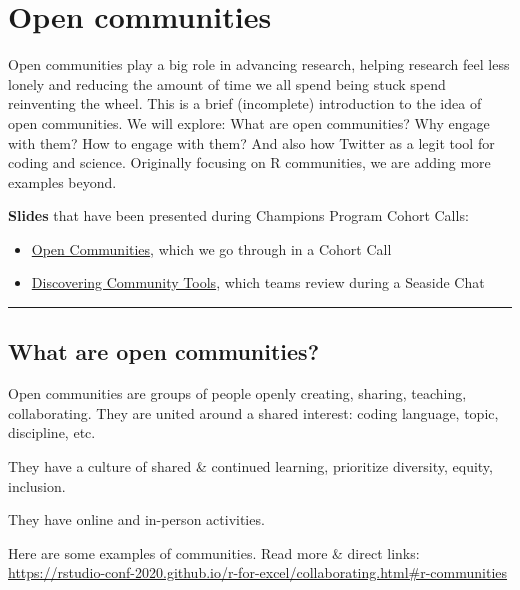 \documentclass[
  letterpaper,
  DIV=11,
  numbers=noendperiod]{scrreprt}
\providecommand{\tightlist}{%
  \setlength{\itemsep}{0pt}\setlength{\parskip}{0pt}}
\begin{document}
\hypertarget{communities}{%
\chapter{Open communities}\label{communities}}

Open communities play a big role in advancing research, helping research
feel less lonely and reducing the amount of time we all spend being
stuck spend reinventing the wheel. This is a brief (incomplete)
introduction to the idea of open communities. We will explore: What are
open communities? Why engage with them? How to engage with them? And
also how Twitter as a legit tool for coding and science. Originally
focusing on R communities, we are adding more examples beyond.

\textbf{Slides} that have been presented during Champions Program Cohort
Calls:

\begin{itemize}
\tightlist
\item
  \href{https://docs.google.com/presentation/d/17HSNmBYvPw-7Prioys7WIhL9QGVb3s3bJCLaAJVaChc/edit?usp=sharing}{Open
  Communities}, which we go through in a Cohort Call
\item
  \href{https://docs.google.com/presentation/d/1czvMz7a84jkaYDwHlG1cuKyf9B0mciQJVOFcc7hZtpU/edit?usp=sharing}{Discovering
  Community Tools}, which teams review during a Seaside Chat
\end{itemize}

\begin{center}\rule{0.5\linewidth}{0.5pt}\end{center}

\hypertarget{what-are-open-communities}{%
\section{What are open communities?}\label{what-are-open-communities}}

Open communities are groups of people openly creating, sharing,
teaching, collaborating. They are united around a shared interest:
coding language, topic, discipline, etc.

They have a culture of shared \& continued learning, prioritize
diversity, equity, inclusion.

They have online and in-person activities.

Here are some examples of communities. Read more \& direct links:
\url{https://rstudio-conf-2020.github.io/r-for-excel/collaborating.html\#r-communities}
\end{document}
